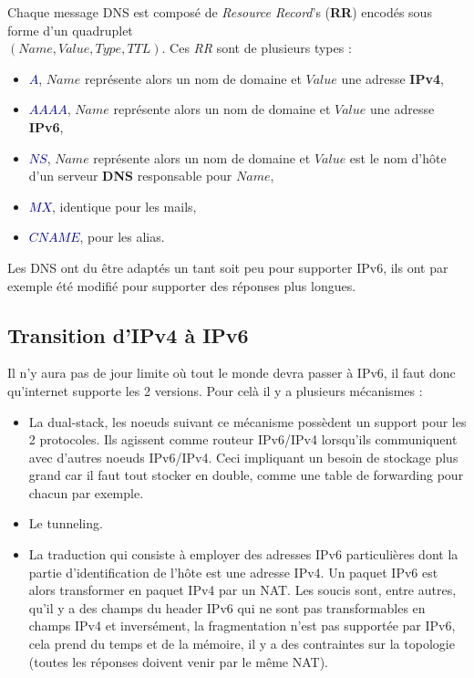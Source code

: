 \documentclass{article}
\newcommand{\titre}[1]{\textcolor{title}{#1}}
\newcommand{\blu}[1]{\textcolor{darkblue}{#1}}
\newcommand{\term}[1]{\textit{\textcolor{maintitle}{#1}}}
\begin{document}
\begin{sffamily}
\noindent Chaque message DNS est composé de \term{Resource Record}'s (\textbf{RR}) encodés sous forme d'un quadruplet\\
$(Name,Value,Type,TTL)$. Ces \term{RR} sont de plusieurs types :
\begin{itemize}
\item \blu{$A$}, $Name$ représente alors un nom de domaine et $Value$ une adresse \textbf{IPv4},
\item \blu{$AAAA$}, $Name$ représente alors un nom de domaine et $Value$ une adresse \textbf{IPv6},
\item \blu{$NS$}, $Name$ représente alors un nom de domaine et $Value$ est le nom d'hôte d'un serveur \textbf{DNS} responsable 
pour $Name$,
\item \blu{$MX$}, identique pour les mails,
\item \blu{$CNAME$}, pour les alias.\\
\end{itemize}

Les DNS ont du être adaptés un tant soit peu pour supporter IPv6, ils ont par exemple été modifié pour supporter des réponses 
plus longues.

\subsection{Transition d'IPv4 à IPv6}

Il n'y aura pas de jour limite où tout le monde devra passer à IPv6, il faut donc qu'internet supporte les 2 versions. Pour celà 
il y a plusieurs mécanismes :
\begin{itemize}
\item \titre{La dual-stack}, les noeuds suivant ce mécanisme possèdent un support pour les 2 protocoles. Ils agissent comme 
routeur IPv6/IPv4 lorsqu'ils communiquent avec d'autres noeuds IPv6/IPv4. Ceci impliquant un besoin de stockage plus grand car 
il faut tout stocker en double, comme une table de forwarding pour chacun par exemple.
\item \titre{Le tunneling}.
\item \titre{La traduction} qui consiste à employer des adresses IPv6 particulières dont la partie d'identification de l'hôte 
est une adresse IPv4. Un paquet IPv6 est alors transformer en paquet IPv4 par un NAT. Les soucis sont, entre autres, qu'il y a 
des champs du header IPv6 qui ne sont pas transformables en champs IPv4 et inversément, la fragmentation n'est pas supportée 
par IPv6, cela prend du temps et de la mémoire, il y a des contraintes sur la topologie (toutes les réponses doivent venir par 
le même NAT).
\end{itemize}


\end{sffamily}
\end{document}
